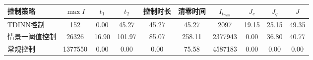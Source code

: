 \begin{tabular}{lccccccccc}
\toprule
控制策略 & $\max I$ & $t_1$ & $t_2$ & 控制时长 & 清零时间 & $I_{t_{cum}}$ & $J_c$ & $J_q$ & $J$ \\
\midrule
TDINN控制 & 152 & 0.00 & 45.27 & 45.27 & 45.27 & 2097 & 19.15 & 25.15 & 49.35 \\
情景一阈值控制 & 26326 & 16.90 & 101.97 & 85.07 & 258.11 & 2377943 & 0.00 & 36.80 & 40.77 \\
常规控制 & 1377550 & 0.00 & 0.00 & 0.00 & 75.58 & 4587183 & 0.00 & 0.00 & 0.00 \\
\bottomrule
\end{tabular}
